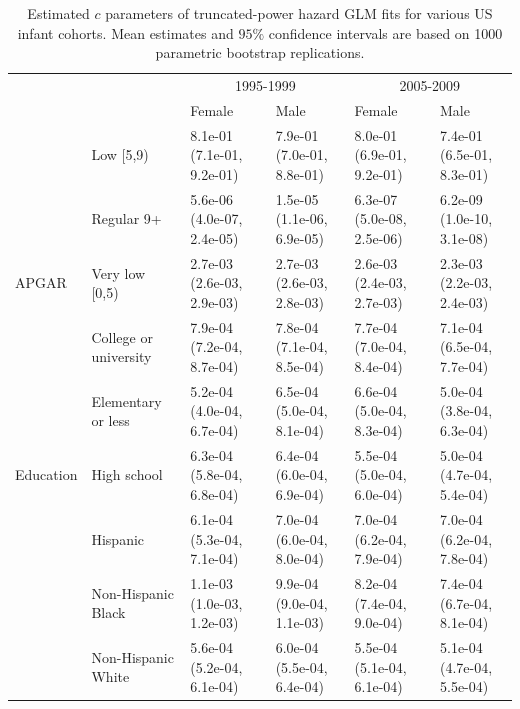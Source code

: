 \documentclass[smallextended]{svjour3} %
\begin{document}
\begin{landscape}\begin{table}[t]

\caption{\label{tab:tab-ci-c}Estimated $c$ parameters of truncated-power hazard GLM fits for various US infant cohorts. Mean estimates and $95\%$ confidence intervals are based on 1000 parametric bootstrap replications.}
\centering
\begin{tabular}{llllll}
\toprule
\multicolumn{2}{c}{ } & \multicolumn{2}{c}{1995-1999} & \multicolumn{2}{c}{2005-2009} \\
\cmidrule(l{3pt}r{3pt}){3-4} \cmidrule(l{3pt}r{3pt}){5-6}
 &  & Female & Male & Female & Male\\
\midrule
 & Low [5,9) & 8.1e-01 (7.1e-01, 9.2e-01) & 7.9e-01 (7.0e-01, 8.8e-01) & 8.0e-01 (6.9e-01, 9.2e-01) & 7.4e-01 (6.5e-01, 8.3e-01)\\

 & Regular 9+ & 5.6e-06 (4.0e-07, 2.4e-05) & 1.5e-05 (1.1e-06, 6.9e-05) & 6.3e-07 (5.0e-08, 2.5e-06) & 6.2e-09 (1.0e-10, 3.1e-08)\\

\multirow{-3}{*}{\raggedright\arraybackslash APGAR} & Very low [0,5) & 2.7e-03 (2.6e-03, 2.9e-03) & 2.7e-03 (2.6e-03, 2.8e-03) & 2.6e-03 (2.4e-03, 2.7e-03) & 2.3e-03 (2.2e-03, 2.4e-03)\\
\cmidrule{1-6}
 & College or university & 7.9e-04 (7.2e-04, 8.7e-04) & 7.8e-04 (7.1e-04, 8.5e-04) & 7.7e-04 (7.0e-04, 8.4e-04) & 7.1e-04 (6.5e-04, 7.7e-04)\\

 & Elementary or less & 5.2e-04 (4.0e-04, 6.7e-04) & 6.5e-04 (5.0e-04, 8.1e-04) & 6.6e-04 (5.0e-04, 8.3e-04) & 5.0e-04 (3.8e-04, 6.3e-04)\\

\multirow{-3}{*}{\raggedright\arraybackslash Education} & High school & 6.3e-04 (5.8e-04, 6.8e-04) & 6.4e-04 (6.0e-04, 6.9e-04) & 5.5e-04 (5.0e-04, 6.0e-04) & 5.0e-04 (4.7e-04, 5.4e-04)\\
\cmidrule{1-6}
 & Hispanic & 6.1e-04 (5.3e-04, 7.1e-04) & 7.0e-04 (6.0e-04, 8.0e-04) & 7.0e-04 (6.2e-04, 7.9e-04) & 7.0e-04 (6.2e-04, 7.8e-04)\\

 & Non-Hispanic Black & 1.1e-03 (1.0e-03, 1.2e-03) & 9.9e-04 (9.0e-04, 1.1e-03) & 8.2e-04 (7.4e-04, 9.0e-04) & 7.4e-04 (6.7e-04, 8.1e-04)\\

 & Non-Hispanic White & 5.6e-04 (5.2e-04, 6.1e-04) & 6.0e-04 (5.5e-04, 6.4e-04) & 5.5e-04 (5.1e-04, 6.1e-04) & 5.1e-04 (4.7e-04, 5.5e-04)\\


\end{tabular}
\end{table}
\end{landscape}
\end{document}
